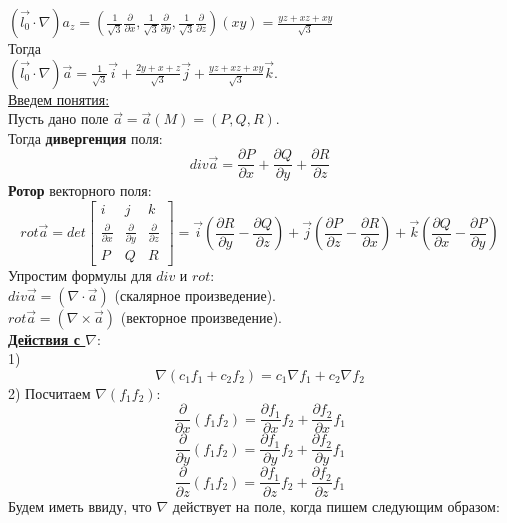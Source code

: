 \documentclass[12pt]{article}
\begin{document}
$(\overrightarrow{l_0} \cdot \nabla)a_z = (\frac{1}{\sqrt{3}} \frac{\partial}{\partial x},\frac{1}{\sqrt{3}} \frac{\partial}{\partial y},\frac{1}{\sqrt{3}} \frac{\partial}{\partial z})(xy) = \frac{yz+xz+xy}{\sqrt{3}}$\\
Тогда\\
$(\overrightarrow{l_0} \cdot \nabla)\overrightarrow{a} = \frac{1}{\sqrt{3}}\overrightarrow{i} + \frac{2y+x+z}{\sqrt{3}}\overrightarrow{j} + \frac{yz+xz+xy}{\sqrt{3}}\overrightarrow{k}$.\\
\uline{Введем понятия:}\\
Пусть дано поле $\overrightarrow{a} = \overrightarrow{a}(M) = (P,Q,R)$.\\
Тогда \textbf{дивергенция} поля:\\
$$div\overrightarrow{a} = \frac{\partial P}{\partial x} + \frac{\partial Q}{\partial y} + \frac{\partial R}{\partial z}$$
\textbf{Ротор} векторного поля:\\
$$rot\overrightarrow{a} = det \begin{bmatrix} i & j & k \\ \frac{\partial}{\partial x} & \frac{\partial}{\partial y} & \frac{\partial}{\partial z} \\ P & Q & R \end{bmatrix} = \overrightarrow{i} (\frac{\partial R}{\partial y} - \frac{\partial Q}{\partial z}) + \overrightarrow{j}(\frac{\partial P}{\partial z} - \frac{\partial R}{\partial x}) + \overrightarrow{k}(\frac{\partial Q}{\partial x} - \frac{\partial P}{\partial y})$$
Упростим формулы для $div$ и $rot$:\\
$div \overrightarrow{a} = (\nabla \cdot \overrightarrow{a})$ (скалярное произведение).\\
$rot \overrightarrow{a} = (\nabla \times \overrightarrow{a})$ (векторное произведение).\\
\uline{\textbf{Действия с $\nabla$}}:\\
1) $$\nabla(c_1 f_1 + c_2 f_2) = c_1 {\nabla f_1} + c_2 {\nabla f_2}$$
2) Посчитаем $\nabla(f_1 f_2)$:\\
$$\frac{\partial}{\partial x}(f_1 f_2) = \frac{\partial f_1}{\partial x} f_2 + \frac{\partial f_2}{\partial x} f_1$$
$$\frac{\partial}{\partial y}(f_1 f_2) = \frac{\partial f_1}{\partial y} f_2 + \frac{\partial f_2}{\partial y} f_1$$
$$\frac{\partial}{\partial z}(f_1 f_2) = \frac{\partial f_1}{\partial z} f_2 + \frac{\partial f_2}{\partial z} f_1$$
Будем иметь ввиду, что $\nabla$ действует на поле, когда пишем следующим образом:\\
\end{document}

